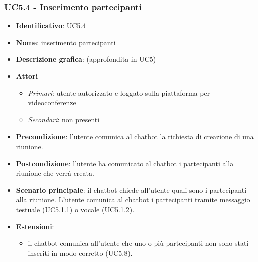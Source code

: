 \subsubsection{UC5.4 - Inserimento partecipanti}
\begin{itemize}
    \item \textbf{Identificativo}: UC5.4
    \item \textbf{Nome}: inserimento partecipanti
    \item \textbf{Descrizione grafica}: (approfondita in UC5)
    \item \textbf{Attori}
 \begin{itemize} 
    \item \textit{Primari}: utente autorizzato e loggato sulla piattaforma per videoconferenze
    \item \textit{Secondari}: non presenti
 \end{itemize}
 \item \textbf{Precondizione}: l'utente comunica al chatbot la richiesta di creazione di una riunione.
 \item \textbf{Postcondizione}: l'utente ha comunicato al chatbot i partecipanti alla riunione che verrà creata.
 \item \textbf{Scenario principale}: il chatbot chiede all'utente quali sono i partecipanti alla riunione. L'utente comunica al chatbot i partecipanti tramite messaggio testuale (UC5.1.1) o vocale (UC5.1.2).
 \item \textbf{Estensioni}: 
 \begin{itemize} 
    \item il chatbot comunica all'utente che uno o più partecipanti non sono stati inseriti in modo corretto (UC5.8).
 \end{itemize}
\end{itemize}

